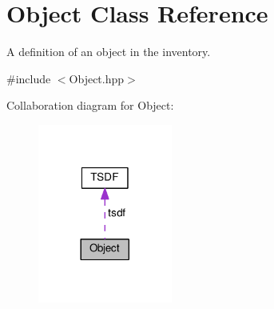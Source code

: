\hypertarget{classObject}{}\section{Object Class Reference}
\label{classObject}


A definition of an object in the inventory.  




{\ttfamily \#include $<$Object.\+hpp$>$}



Collaboration diagram for Object\+:\nopagebreak
\begin{figure}[H]
\begin{center}
\leavevmode
\includegraphics[width=125pt]{classObject__coll__graph}
\end{center}
\end{figure}

